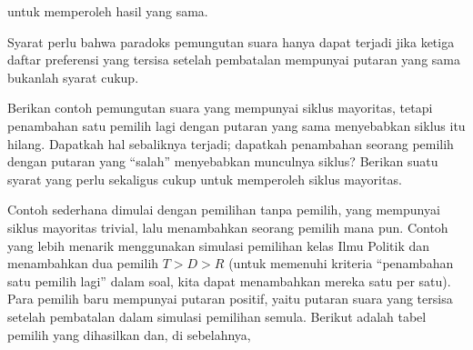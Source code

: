 \begin{exercises}
\begin{answer}
\begin{equation*}
       \tag*{}\end{equation*}
       untuk memperoleh hasil yang sama.
    \end{answer}
  \item \label{exer:VoterCondNotSuff} 
    Syarat perlu bahwa
    paradoks pemungutan suara hanya dapat terjadi jika ketiga daftar preferensi yang tersisa
    setelah pembatalan mempunyai putaran yang sama bukanlah syarat cukup.
    \begin{exparts}
      \partsitem Berikan contoh pemungutan suara yang mempunyai siklus mayoritas,
        tetapi penambahan satu pemilih lagi dengan putaran yang sama menyebabkan siklus itu
        hilang.
      \partsitem Dapatkah hal sebaliknya terjadi; dapatkah penambahan seorang pemilih dengan
        putaran yang ``salah'' menyebabkan munculnya siklus?
      \partsitem Berikan suatu syarat yang perlu sekaligus cukup
        untuk memperoleh siklus mayoritas.
    \end{exparts}
    \begin{answer}
      \begin{exparts}
        \partsitem Contoh sederhana dimulai dengan pemilihan tanpa pemilih,
          yang mempunyai siklus mayoritas trivial, lalu menambahkan seorang pemilih mana pun.
          Contoh yang lebih menarik menggunakan simulasi
          pemilihan kelas Ilmu Politik dan menambahkan dua pemilih $T>D>R$
          (untuk memenuhi kriteria
          ``penambahan satu pemilih lagi'' dalam soal,
          kita dapat menambahkan mereka satu per satu).
          Para pemilih baru mempunyai putaran positif, yaitu
          putaran suara yang tersisa setelah pembatalan dalam simulasi
          pemilihan semula.
          Berikut adalah tabel pemilih yang dihasilkan dan, di sebelahnya,

\end{exparts}
\end{answer}
\end{exercises}
